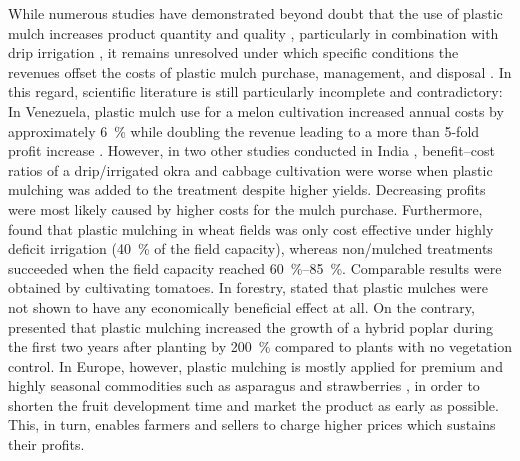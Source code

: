 While numerous studies have demonstrated beyond doubt that the use of plastic mulch increases product quantity and quality \citep[for instance,][]{LaugaleInfluence2015,OverbeckReflective2013, Ruiz-MachucaCultivation2015}, particularly in combination with drip irrigation \citep{BiswasEffect2015,Lopez-LopezWater2015}, it remains unresolved under which specific conditions the revenues offset the costs of plastic mulch purchase, management, and disposal \citep{FisherAlternative1995,MugallaProfitability1996}. In this regard, scientific literature is still particularly incomplete and contradictory: In Venezuela, plastic mulch use for a melon cultivation increased annual costs by approximately \SI{6}{\percent} while doubling the revenue leading to a more than 5-fold profit increase \citep{NavaBeneficios2011}. However, in two other studies conducted in India \citep{TiwariResponse1998,TiwariEffect2003}, benefit--cost ratios of a drip\-/irrigated okra and cabbage cultivation were worse when plastic mulching was added to the treatment despite higher yields. Decreasing profits were most likely caused by higher costs for the mulch purchase. Furthermore, \citet{XieEffect2005} found that plastic mulching in wheat fields was only cost effective under highly deficit irrigation (\SI{40}{\percent} of the field capacity), whereas non\-/mulched treatments succeeded when the field capacity reached \SIrange[range-phrase = { to }]{60}{85}{\percent}. Comparable results were obtained by \citet{BiswasEffect2015} cultivating tomatoes. In forestry, \citet{LeclercPaillage1997} stated that plastic mulches were not shown to have any economically beneficial effect at all. On the contrary, \citet{BohleniusExploration2015} presented that plastic mulching increased the growth of a hybrid poplar during the first two years after planting by \SI{200}{\percent} compared to plants with no vegetation control. In Europe, however, plastic mulching is mostly applied for premium and highly seasonal commodities such as asparagus and strawberries \citep{HeissnerComparison2005,StevensHorticultural2011}, in order to shorten the fruit development time and market the product as early as possible. This, in turn, enables farmers and sellers to charge higher prices \citep{JohnsonWeed2005,PolingFrost1991} which sustains their profits.

